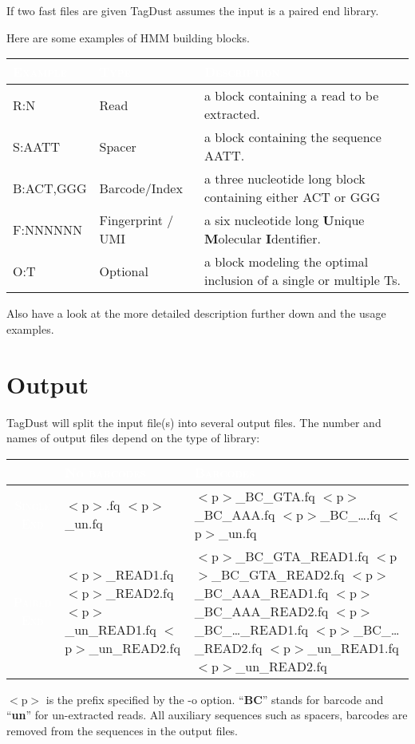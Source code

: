 \documentclass[11pt,a4paper,oneside]{book}
\begin{document}
If two fast files are given TagDust assumes the input is a paired end library.



Here are some examples of HMM building blocks. \begin{center}
\begin{tabular}{| l | l | p{12cm}|}
\hline
\rowcolor{blue} \textcolor{white}{\scshape Example}		&\textcolor{white}{\scshape Type}		&	\textcolor{white}{\scshape Description}\\ \hline
R:N & Read  & a block containing a read to be extracted.\\
S:AATT & Spacer & a block containing the sequence AATT.\\ 
B:ACT,GGG & Barcode/Index & a three nucleotide long block containing either ACT or GGG\\ 
F:NNNNNN & Fingerprint / UMI & a six nucleotide long {\bf U}nique {\bf M}olecular {\bf I}dentifier.\\ 
O:T  & Optional & a block modeling the optimal inclusion of a single or multiple Ts.\\
\hline
\end{tabular}
\end{center}

Also have a look at the more detailed description further down and the usage examples. 


\newpage 
\section{Output}
TagDust will split the input file(s) into several output files. The number and names of output files depend on the type of library: 


\begin{center}
\begin{tabular}{ | c | p{4.5cm} | p{4.5cm}|}
\hline
 \textcolor{white}{\scshape }		&\cellcolor{blue}\textcolor{white}{\scshape No barcodes}		&	\cellcolor{blue}\textcolor{white}{\scshape Barcodes}\\ \hline
\cellcolor{blue}\textcolor{white}{\scshape Single End} & $<$p$>$.fq \newline $<$p$>$\_un.fq & $<$p$>$\_BC\_GTA.fq $<$p$>$\_BC\_AAA.fq $<$p$>$\_BC\_\dots.fq \newline $<$p$>$\_un.fq \\
\cellcolor{blue}\textcolor{white}{\scshape Paired End} &  $<$p$>$\_READ1.fq $<$p$>$\_READ2.fq $<$p$>$\_un\_READ1.fq $<$p$>$\_un\_READ2.fq   & $<$p$>$\_BC\_GTA\_READ1.fq $<$p$>$\_BC\_GTA\_READ2.fq  $<$p$>$\_BC\_AAA\_READ1.fq $<$p$>$\_BC\_AAA\_READ2.fq $<$p$>$\_BC\_\dots\_READ1.fq $<$p$>$\_BC\_\dots\_READ2.fq $<$p$>$\_un\_READ1.fq $<$p$>$\_un\_READ2.fq\\ 
\hline
\end{tabular}
\end{center}
$<$p$>$ is the prefix specified by the -o option. ``{\bf BC}'' stands for barcode and ``{\bf un}'' for un-extracted reads. All auxiliary sequences such as spacers, barcodes are removed from the sequences in the output files. 
\end{document}
